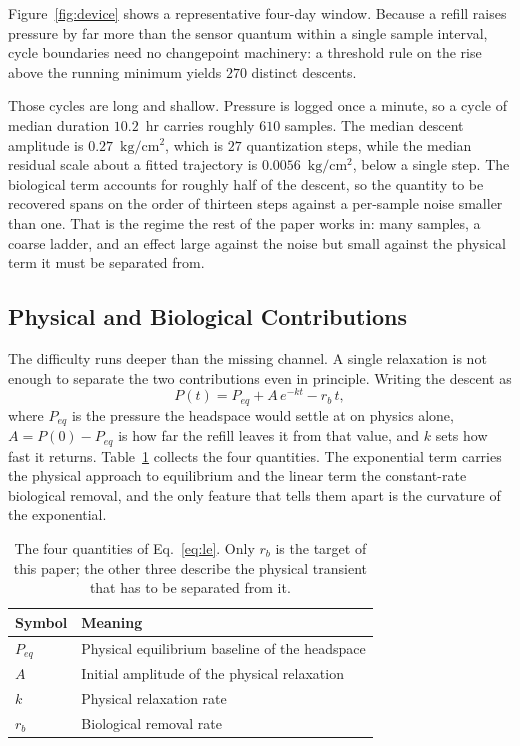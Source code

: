\documentclass[sigconf]{acmart}
\newcommand{\pu}{\ensuremath{\mathrm{kg/cm^{2}}}}
\newcommand{\rb}{\ensuremath{r_{b}}}
\begin{document}
Figure~\ref{fig:device} shows a representative four-day window. Because a refill raises
pressure by far more than the sensor quantum within a single sample
interval, cycle boundaries need no changepoint machinery: a threshold
rule on the rise above the running minimum yields $270$ distinct
descents.

Those cycles are long and shallow. Pressure is logged once a minute, so
a cycle of median duration $10.2$~hr carries roughly $610$ samples. The
median descent amplitude is $0.27$~\pu{}, which is $27$ quantization
steps, while the median residual scale about a fitted trajectory is
$0.0056$~\pu{}, below a single step. The biological term accounts for
roughly half of the descent, so the quantity to be recovered spans on
the order of thirteen steps against a per-sample noise smaller than
one.
That is the regime the rest of the paper works in: many samples, a
coarse ladder, and an effect large against the noise but small against
the physical term it must be separated from.

\subsection{Physical and Biological Contributions}

The difficulty runs deeper than the missing channel. A single
relaxation is not enough to separate the two contributions even in
principle. Writing the descent as
\begin{equation}
P(t)=P_{eq}+A\,e^{-kt}-\rb\,t ,
\label{eq:le}
\end{equation}
where $P_{eq}$ is the pressure the headspace would settle at on physics
alone, $A=P(0)-P_{eq}$ is how far the refill leaves it from that value,
and $k$ sets how fast it returns. Table~\ref{tab:params} collects the
four quantities. The exponential term carries the physical approach to
equilibrium and the linear term the constant-rate biological removal,
and the only feature that tells them apart is the curvature of the
exponential.

\begin{table}[t]
\caption{The four quantities of Eq.~\eqref{eq:le}. Only \rb{} is the
target of this paper; the other three describe the physical transient
that has to be separated from it.}
\label{tab:params}
\centering
\begin{tabular}{ll}
\toprule
Symbol & Meaning \\
\midrule
$P_{eq}$ & Physical equilibrium baseline of the headspace \\
$A$      & Initial amplitude of the physical relaxation \\
$k$      & Physical relaxation rate \\
\rb{}    & Biological removal rate \\
\bottomrule
\end{tabular}
\end{table}
\end{document}
